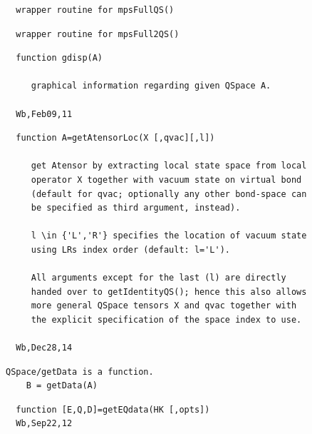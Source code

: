\documentclass[twoside,12pt]{article}
\begin{document}

\begin{verbatim}
  wrapper routine for mpsFullQS()
\end{verbatim}

\pagebreak[3]



\begin{verbatim}
  wrapper routine for mpsFull2QS()
\end{verbatim}

\pagebreak[3]



\begin{verbatim}
  function gdisp(A)
 
     graphical information regarding given QSpace A.
 
  Wb,Feb09,11
\end{verbatim}

\pagebreak[3]



\begin{verbatim}
  function A=getAtensorLoc(X [,qvac][,l])
     
     get Atensor by extracting local state space from local
     operator X together with vacuum state on virtual bond
     (default for qvac; optionally any other bond-space can
     be specified as third argument, instead).
 
     l \in {'L','R'} specifies the location of vacuum state
     using LRs index order (default: l='L').
 
     All arguments except for the last (l) are directly
     handed over to getIdentityQS(); hence this also allows
     more general QSpace tensors X and qvac together with
     the explicit specification of the space index to use.
 
  Wb,Dec28,14
\end{verbatim}

\pagebreak[3]



\begin{verbatim}
QSpace/getData is a function.
    B = getData(A)
\end{verbatim}

\pagebreak[3]



\begin{verbatim}
  function [E,Q,D]=getEQdata(HK [,opts])
  Wb,Sep22,12
\end{verbatim}
\end{document}
